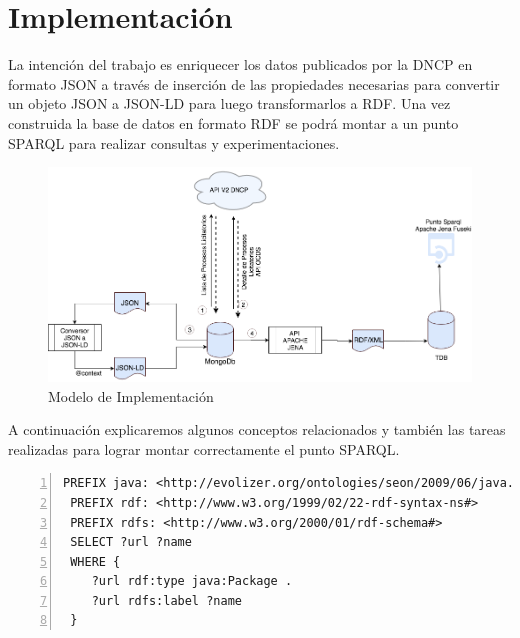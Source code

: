 \chapter{Implementación}
\label{chap:Implementación de la Ontologia}


La intención del trabajo es enriquecer los datos publicados por la DNCP en formato JSON a través de inserción de las propiedades necesarias para convertir un objeto JSON a JSON-LD para luego transformarlos a RDF. Una vez construida la base de datos en formato RDF se podrá montar a un punto SPARQL para realizar consultas y experimentaciones.


\begin{figure}[h!]
   \centering
   \includegraphics[width=150mm]{figuras/Diagramas-Implementacion.png}
   \caption{Modelo de Implementación}
   \label{img:modelo de Implementacion}
\end{figure}

A continuación explicaremos algunos conceptos relacionados y también las tareas realizadas para lograr montar correctamente el punto SPARQL.







\begin{lstlisting}[captionpos=b, caption=SPARQL query, label=lst:sparql,  numbers=left,  numberstyle=\tiny\color{mygray},
    basicstyle=\ttfamily,frame=single]
 PREFIX java: <http://evolizer.org/ontologies/seon/2009/06/java.owl#>
 PREFIX rdf: <http://www.w3.org/1999/02/22-rdf-syntax-ns#>
 PREFIX rdfs: <http://www.w3.org/2000/01/rdf-schema#>
 SELECT ?url ?name
 WHERE {
    ?url rdf:type java:Package .
    ?url rdfs:label ?name
 }
 \end{lstlisting}

